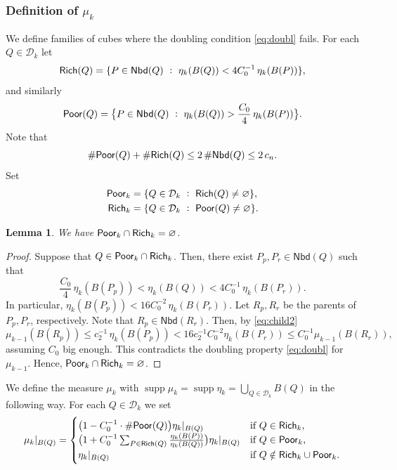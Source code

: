 \documentclass[11pt,reqno]{amsart}
\newtheorem{lemma}[theorem]{Lemma}
\theoremstyle{definition}
\theoremstyle{remark}
\numberwithin{equation}{section}
\newcommand{\dD}{\mathcal{D}}
\newcommand{\DD}{\mathcal{D}}
\DeclareMathOperator{\supp}{supp}
\newcommand{\Nei}{\mathsf{Nbd}}
\theoremstyle{theorem}
\theoremstyle{definition}
\theoremstyle{remark}
\numberwithin{equation}{section}
\begin{document}
\subsubsection{Definition of $\mu_k$}
We define families of cubes where the doubling condition \eqref{eq:doubl} fails. For each $Q\in\DD_k$ let
\begin{equation*}
\Rich(Q) = \{P\in\Nei(Q)\ :\ \eta_k(B(Q))< 4C_0^{-1}\, \eta_{k}(B(P)) \},
\end{equation*}
and similarly
\begin{equation*}
\Poor(Q) = \big\{P\in\Nei(Q)\ :\ \eta_k(B(Q))> \frac{C_0}{4}\, \eta_{k}(B(P)) \big\}.
\end{equation*}
Note that 
\begin{equation}\label{eq:poorcard}
\#\Poor(Q) +\#\Rich(Q)\le 2\, \#\Nei(Q)\le 2\,c_n.
\end{equation}
Set 
\begin{align*}
	\Poor_k &= \{Q\in\DD_k \ :\ \Rich(Q)\neq\varnothing\},\\
	\Rich_k &= \{Q\in\DD_k \ :\ \Poor(Q)\neq\varnothing\}.
\end{align*} 
\begin{lemma}\label{lem:poorrichdisjoint}
	We have $\mathsf{Poor}_k\cap\mathsf{Rich}_k=\varnothing$.
\end{lemma}
\begin{proof}
	Suppose that $Q\in\mathsf{Poor}_k\cap\mathsf{Rich}_k$. Then, there exist $P_p, P_r\in\Nei(Q)$ such that
	\begin{equation*}
		\frac{C_0}{4}\,\eta_{k}(B(P_p))< \eta_k(B(Q)) < 4C_0^{-1}\, \eta_{k}(B(P_r)).
	\end{equation*}
	In particular, $\eta_{k}(B(P_p)) < 16C_0^{-2}\,  \eta_{k}(B(P_r))$. Let $R_p, R_r$ be the parents of $P_p, P_r$, respectively. Note that $R_p\in\Nei(R_r)$. Then, by \eqref{eq:child2}
	\begin{equation*}
		\mu_{k-1}(B(R_p))\le c_2^{-1}\,\eta_{k}(B(P_p))<16c_2^{-1}C_0^{-2}\eta_{k}(B(P_r))\le C_0^{-1}\mu_{k-1}(B(R_r)),
	\end{equation*}
	assuming $C_0$ big enough. This contradicts the doubling property \eqref{eq:doubl} for $\mu_{k-1}$. Hence, $\mathsf{Poor}_k\cap\mathsf{Rich}_k=\varnothing$.
\end{proof}

We define the measure $\mu_k$ with $\supp\mu_k = \supp\eta_k = \bigcup_{Q \in \dD_k} B(Q)$ in the following way. For each $Q\in\DD_k$ we set
\begin{equation*}
	\mu_k|_{B(Q)} = \begin{cases}
		\big(1-  C_0^{-1}\cdot \#\mathsf{Poor}(Q) \big) \eta_k|_{B(Q)} & \text{if $Q\in\mathsf{Rich}_k$,}\\
		\big(1 + C_0^{-1}\sum_{P\in\mathsf{Rich}(Q)} \frac{\eta_k(B(P))}{\eta_k(B(Q))}\big) \eta_k|_{B(Q)} & \text{if $Q\in\mathsf{Poor}_k$,}\\
		\eta_k|_{B(Q)} & \text{if $Q\notin\mathsf{Rich}_k\cup\mathsf{Poor}_k$.}
	\end{cases}
\end{equation*}
\end{document}
